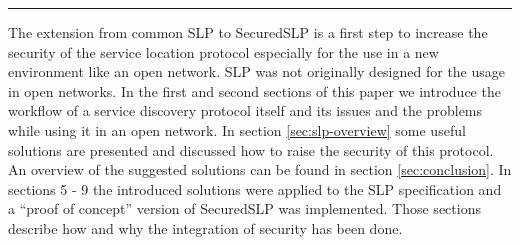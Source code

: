 \hrule
The extension from common SLP to SecuredSLP is a first step to increase the security of the service location protocol especially for the use in a new environment like an open network. SLP was not originally designed for the usage in open networks. In the first and second sections of this paper we introduce the workflow of a service discovery protocol itself and its issues and the problems while using it in an open network. In section \ref{sec:slp-overview} some useful solutions are presented and discussed how to raise the security of this protocol. An overview of the suggested solutions can be found in section \ref{sec:conclusion}. In sections 5 - 9 the introduced solutions were applied to the SLP specification and a ``proof of concept'' version of SecuredSLP was implemented. Those sections describe how and why the integration of security has been done.